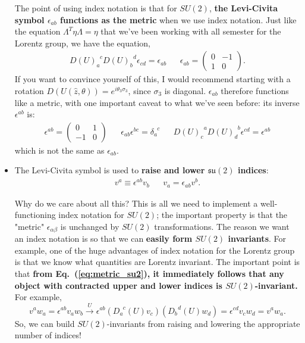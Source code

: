 \documentclass[12pt, oneside]{article}   	%
\theoremstyle{definition}
\begin{document}
\begin{itemize}
	The point of using index notation is that for $SU(2)$, \textbf{the Levi-Civita symbol $\epsilon_{ab}$ functions as the metric} when we use index notation. Just like the equation $\Lambda^T \eta \Lambda = \eta$ that we've been working with all semester for the Lorentz group, we have the equation,
	\begin{align}
		D(U)_a^{\;\; c} D(U)_b^{\;\; d} \epsilon_{cd} = \epsilon_{ab} && \epsilon_{ab} = \begin{pmatrix} 0 & -1 \\ 1 & 0 \end{pmatrix}. \label{eq:metric_su2}
	\end{align}
	If you want to convince yourself of this, I would recommend starting with a rotation $D(U(\hat{z}, \theta)) = e^{i\theta_3 \sigma_3}$, since $\sigma_3$ is diagonal. $\epsilon_{ab}$ therefore functions like a metric, with one important caveat to what we've seen before: its inverse $\epsilon^{ab}$ is:
	\begin{align}
		\epsilon^{ab} = \begin{pmatrix} 0 & 1 \\ -1 & 0 \end{pmatrix} && \epsilon_{ab}\epsilon^{bc} = \delta_a^{\;\; c} && D(U)^{\;\; a}_{ c} D(U)^{\;\; b}_{d} \epsilon^{cd} = \epsilon^{ab}
	\end{align}
	which is not the same as $\epsilon_{ab}$.
	\item The Levi-Civita symbol is used to \textbf{raise and lower $\mathfrak{su}(2)$ indices}:
	\begin{align}
		v^a \equiv \epsilon^{ab} v_b && v_a = \epsilon_{ab} v^b.
	\end{align}
	
	Why do we care about all this? This is all we need to implement a well-functioning index notation for $SU(2)$; the important property is that the "metric" $\epsilon_{\alpha\beta}$ is unchanged by $SU(2)$ transformations. The reason we want an index notation is so that we can \textbf{easily form $SU(2)$ invariants}. For example, one of the huge advantages of index notation for the Lorentz group is that we know what quantities are Lorentz invariant. The important point is that \textbf{from Eq.~(\ref{eq:metric_su2}), it immediately follows that any object with contracted upper and lower indices is $SU(2)$-invariant.} For example,
	\begin{equation}
		v^a w_a = \epsilon^{ab} v_a w_b \xrightarrow{U} \epsilon^{ab} (D_a^{\;\; c}(U) v_c) (D_b^{\;\; d}(U) w_d) = \epsilon^{cd} v_c w_d = v^a w_a.
	\end{equation}
	So, we can build $SU(2)$-invariants from raising and lowering the appropriate number of indices! 
	

\end{itemize}
\end{document}
